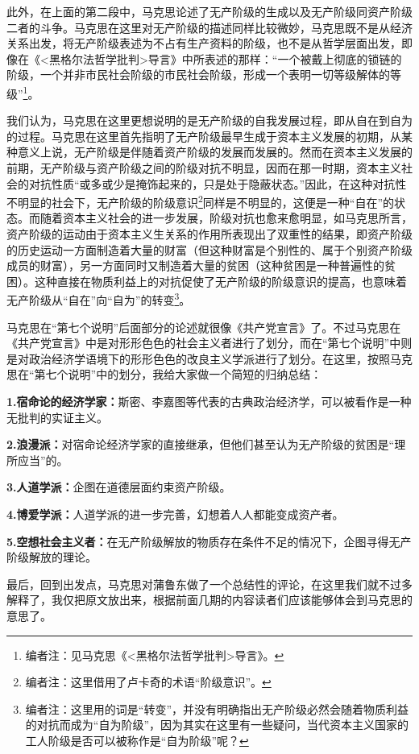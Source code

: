 \documentclass[a4paper,twoside,12pt,AutoFakeBold]{ctexart}
\begin{document}
此外，在上面的第二段中，马克思论述了无产阶级的生成以及无产阶级同资产阶级二者的斗争。马克思在这里对无产阶级的描述同样比较微妙，马克思既不是从经济关系出发，将无产阶级表述为不占有生产资料的阶级，也不是从哲学层面出发，即像在《<黑格尔法哲学批判>导言》中所表述的那样：“一个被戴上彻底的锁链的阶级，一个并非市民社会阶级的市民社会阶级，形成一个表明一切等级解体的等级”\footnote{编者注：见马克思《<黑格尔法哲学批判>导言》。}。

我们认为，马克思在这里更想说明的是无产阶级的自我发展过程，即从自在到自为的过程。马克思在这里首先指明了无产阶级最早生成于资本主义发展的初期，从某种意义上说，无产阶级是伴随着资产阶级的发展而发展的。然而在资本主义发展的前期，无产阶级与资产阶级之间的阶级对抗不明显，因而在那一时期，资本主义社会的对抗性质“或多或少是掩饰起来的，只是处于隐蔽状态。”因此，在这种对抗性不明显的社会下，无产阶级的阶级意识\footnote{编者注：这里借用了卢卡奇的术语“阶级意识”。}同样是不明显的，这便是一种“自在”的状态。而随着资本主义社会的进一步发展，阶级对抗也愈来愈明显，如马克思所言，资产阶级的运动由于资本主义生关系的作用所表现出了双重性的结果，即资产阶级的历史运动一方面制造着大量的财富（但这种财富是个别性的、属于个别资产阶级成员的财富），另一方面同时又制造着大量的贫困（这种贫困是一种普遍性的贫困）。这种直接在物质利益上的对抗促使了无产阶级的阶级意识的提高，也意味着无产阶级从“自在”向“自为”的转变\footnote{编者注：这里用的词是“转变”，并没有明确指出无产阶级必然会随着物质利益的对抗而成为“自为阶级”，因为其实在这里有一些疑问，当代资本主义国家的工人阶级是否可以被称作是“自为阶级”呢？}。

马克思在“第七个说明”后面部分的论述就很像《共产党宣言》了。不过马克思在《共产党宣言》中是对形形色色的社会主义者进行了划分，而在“第七个说明”中则是对政治经济学语境下的形形色色的改良主义学派进行了划分。在这里，按照马克思在“第七个说明”中的划分，我给大家做一个简短的归纳总结：
\begin{tcolorbox}
    \textbf{1.宿命论的经济学家：}斯密、李嘉图等代表的古典政治经济学，可以被看作是一种无批判的实证主义。

    \textbf{2.浪漫派：}对宿命论经济学家的直接继承，但他们甚至认为无产阶级的贫困是“理所应当”的。

    \textbf{3.人道学派：}企图在道德层面约束资产阶级。

    \textbf{4.博爱学派：}人道学派的进一步完善，幻想着人人都能变成资产者。

    \textbf{5.空想社会主义者：}在无产阶级解放的物质存在条件不足的情况下，企图寻得无产阶级解放的理论。
\end{tcolorbox}

最后，回到出发点，马克思对蒲鲁东做了一个总结性的评论，在这里我们就不过多解释了，我仅把原文放出来，根据前面几期的内容读者们应该能够体会到马克思的意思了。
\end{document}
